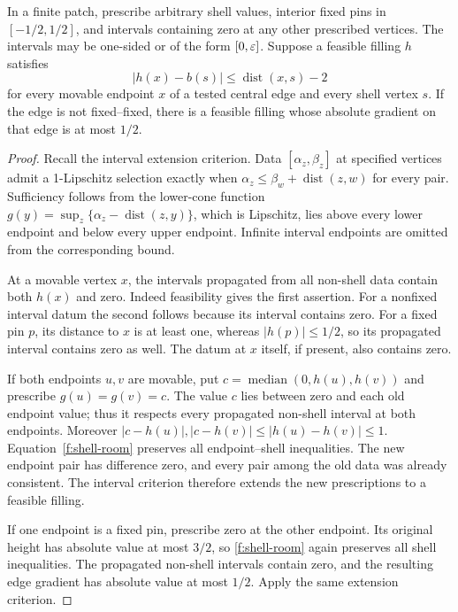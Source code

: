 \begin{lemma}\label{f:strict-filling}
In a finite patch, prescribe arbitrary shell values, interior fixed pins
in $[-1/2,1/2]$, and intervals containing zero at any other prescribed
vertices. The intervals may be one-sided or of the form $[0,\varepsilon]$.
Suppose a feasible filling $h$ satisfies
\begin{equation}\label{f:shell-room}
 |h(x)-b(s)|\le\operatorname{dist}(x,s)-2
\end{equation}
for every movable endpoint $x$ of a tested central edge and every shell
vertex $s$. If the edge is not fixed--fixed, there is a feasible filling
whose absolute gradient on that edge is at most $1/2$.
\end{lemma}
\begin{proof}
Recall the interval extension criterion. Data $[\alpha_z,\beta_z]$ at
specified vertices admit a 1-Lipschitz selection exactly when
$\alpha_z\le\beta_w+\operatorname{dist}(z,w)$ for every pair. Sufficiency
follows from the lower-cone function
$g(y)=\sup_z\{\alpha_z-\operatorname{dist}(z,y)\}$, which is Lipschitz,
lies above every lower endpoint and below every upper endpoint. Infinite
interval endpoints are omitted from the corresponding bound.

At a movable vertex $x$, the intervals propagated from all non-shell data
contain both $h(x)$ and zero. Indeed feasibility gives the first assertion.
For a nonfixed interval datum the second follows because its interval
contains zero. For a fixed pin $p$, its distance to $x$ is at least one,
whereas $|h(p)|\le1/2$, so its propagated interval contains zero as well.
The datum at $x$ itself, if present, also contains zero.

If both endpoints $u,v$ are movable, put
$c=\operatorname{median}(0,h(u),h(v))$ and prescribe $g(u)=g(v)=c$.
The value $c$ lies between zero and each old endpoint value; thus it
respects every propagated non-shell interval at both endpoints. Moreover
$|c-h(u)|,|c-h(v)|\le|h(u)-h(v)|\le1$.
Equation~\eqref{f:shell-room} preserves all endpoint--shell inequalities.
The new endpoint pair has difference zero, and every pair among the old
data was already consistent. The interval criterion therefore extends
the new prescriptions to a feasible filling.

If one endpoint is a fixed pin, prescribe zero at the other endpoint.
Its original height has absolute value at most $3/2$, so
\eqref{f:shell-room} again preserves all shell inequalities. The propagated
non-shell intervals contain zero, and the resulting edge gradient has
absolute value at most $1/2$. Apply the same extension criterion.
\end{proof}

